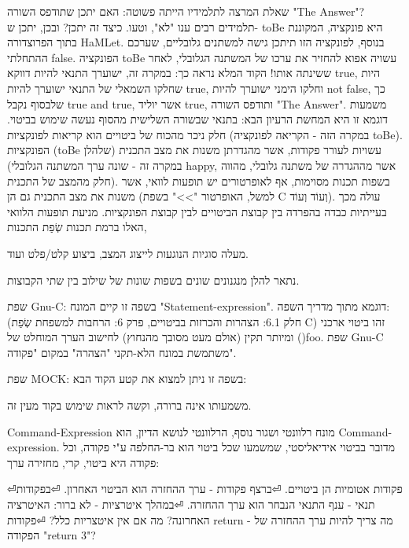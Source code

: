         שאלת המרצה לתלמידיו הייתה פשוטה: האם יתכן שתודפס השורה "The Answer"? תלמידים
        רבים ענו "לא", וטעו. כיצד זה יתכן? ובכן, יתכן ש- toBe היא פונקציה, המקוננת בתוך
        הפרוצדורה HaMLet. בנוסף, לפונקציה הזו תיתכן גישה למשתנים גלובליים, שערכם
        ההתחלתי false. הפונקציה toBe עשויה אפוא להחזיר את ערכו של המשתנה הגלובלי, לאחר
        ששינתה אותו! הקוד המלא נראה כך: במקרה זה, ישוערך התנאי להיות דווקא true, היות
        שחלקו השמאלי של התנאי ישוערך להיות true, וחלקו הימני ישוערך להיות not false, כך
        שלבסוף נקבל true and true, אשר יוליד true, ותודפס השורה "The Answer".
        משמעות דוגמא זו היא המחשת הרעיון הבא:
        בתנאי שבשורה השלישית מהסוף נעשה שימוש בביטוי. חלק ניכר מהכוח של ביטויים הוא קריאות לפונקציות (במקרה הזה - הקריאה לפונקציה toBe). הפונקציות (toBe שלהלן) עשויות לעורר פקודות, אשר מהגדרתן משנות את מצב התכנית (במקרה זה - שונה ערך המשתנה הגלובלי happy, אשר מההגדרה של משתנה גלובלי, מהווה חלק מהמצב של התכנית). בשפות תכנות מסוימות, אף לאופרטורים יש תופעות לוואי, אשר משנות את מצב התכנית גם הן (למשל, האופרטור ">>" בשפת C וְעוֹד וְעוֹד). עולה מכך בעייתיות כבדה בהפרדה בין קבוצת הביטויים לבין קבוצת הפונקציות. מניעת תופעות הלוואי האלו ברמת תכנות שְׂפַת התכנות,

        מעלה סוגיות הנוגעות לייצוג המצב, ביצוע קלט/פלט ועוד.

        נתאר להלן מנגנונים שונים בשפות שונות של שילוב בין שתי הקבוצות.

        שפת Gnu-C:
        בשפה זו קיים המונח "Statement-expression".
        דוגמא מתוך מדריך השפה: (חלק 6.1: הצהרות והכרזות בביטויים, פרק 6: הרחבות למשפחת שְׂפַת C)
        זהו ביטוי ארכני ומיותר תקין (אולם מעט מסובך מהנחוץ) לחישוב הערך המוחלט של ()foo.
        שפת Gnu-C משתמשת במונח הלא-תקני "הצהרה" במקום "פקודה".

        שפת MOCK:
        בשפה זו ניתן למצוא את קטע הקוד הבא:

        משמעותו אינה ברורה, וקשה לראות שימוש בקוד מעין זה.

        Command-Expression
        מונח רלוונטי ושגור נוסף, הרלוונטי לנושא הדיון, הוא Command-expression. מדובר בביטוי אידיאליסטי, שמשמעו שכל ביטוי הוא בר-החלפה ע"י פקודה, וכל פקודה היא ביטוי, קרי, מחזירה ערך:
        \begin{ציינון}
⏎פקודות אטומיות הן ביטויים.
⏎ברצף פקודות - ערך ההחזרה הוא הביטוי האחרון.
⏎בפקודות תנאי - ענף התנאי הנבחר הוא ערך ההחזרה.
⏎במהלך איטרציות - לא ברור: האיטרציה האחרונה? מה אם אין איטצריות כלל?
⏎פקודות return - מה צריך להיות ערך ההחזרה של הפקודה "return 3"?
      \end{ציינון}

